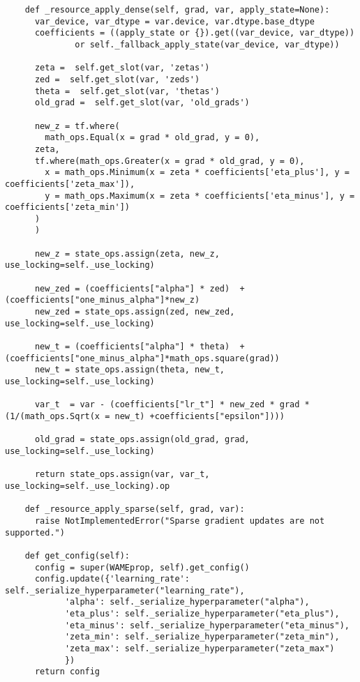 \documentclass[12pt]{article}
\numberwithin{equation}{section}
\numberwithin{figure}{section}
\numberwithin{table}{section}
\begin{document}
\begin{lstlisting}
    def _resource_apply_dense(self, grad, var, apply_state=None):
      var_device, var_dtype = var.device, var.dtype.base_dtype
      coefficients = ((apply_state or {}).get((var_device, var_dtype))
              or self._fallback_apply_state(var_device, var_dtype))
  
      zeta =  self.get_slot(var, 'zetas')
      zed =  self.get_slot(var, 'zeds')
      theta =  self.get_slot(var, 'thetas')
      old_grad =  self.get_slot(var, 'old_grads')
  
      new_z = tf.where(
        math_ops.Equal(x = grad * old_grad, y = 0),
      zeta,
      tf.where(math_ops.Greater(x = grad * old_grad, y = 0),
        x = math_ops.Minimum(x = zeta * coefficients['eta_plus'], y = coefficients['zeta_max']),
        y = math_ops.Maximum(x = zeta * coefficients['eta_minus'], y = coefficients['zeta_min'])
      )
      )
        
      new_z = state_ops.assign(zeta, new_z, use_locking=self._use_locking)
  
      new_zed = (coefficients["alpha"] * zed)  + (coefficients["one_minus_alpha"]*new_z)
      new_zed = state_ops.assign(zed, new_zed, use_locking=self._use_locking)
  
      new_t = (coefficients["alpha"] * theta)  + (coefficients["one_minus_alpha"]*math_ops.square(grad))
      new_t = state_ops.assign(theta, new_t, use_locking=self._use_locking)
  
      var_t  = var - (coefficients["lr_t"] * new_zed * grad * (1/(math_ops.Sqrt(x = new_t) +coefficients["epsilon"])))
  
      old_grad = state_ops.assign(old_grad, grad, use_locking=self._use_locking)
  
      return state_ops.assign(var, var_t, use_locking=self._use_locking).op
  
    def _resource_apply_sparse(self, grad, var):
      raise NotImplementedError("Sparse gradient updates are not supported.")
    
    def get_config(self):
      config = super(WAMEprop, self).get_config()
      config.update({'learning_rate': self._serialize_hyperparameter("learning_rate"),
            'alpha': self._serialize_hyperparameter("alpha"),
            'eta_plus': self._serialize_hyperparameter("eta_plus"),
            'eta_minus': self._serialize_hyperparameter("eta_minus"),
            'zeta_min': self._serialize_hyperparameter("zeta_min"),
            'zeta_max': self._serialize_hyperparameter("zeta_max") 
            })
      return config
  

\end{lstlisting}
\end{document}
